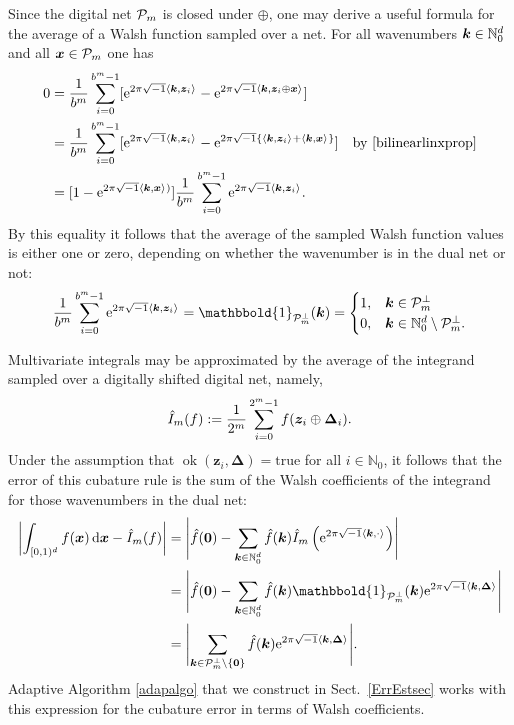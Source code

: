 \documentclass[graybox,footinfo]{svmult}
\newcommand{\N}{\mathbb{N}} %
\newcommand{\bszero}{\boldsymbol{0}} %
\newcommand{\bsx}{\boldsymbol{x}}    %
\newcommand{\bsz}{\boldsymbol{z}}    %
\newcommand{\bsDelta}{\boldsymbol{\Delta}}    %
\newcommand{\ind}{\mathbbold{1}}
\DeclareMathOperator{\ok}{ok}
\begin{document}
Since the digital net $\mathcal{P}_m$ is closed under $\oplus$, one may derive a useful formula for the average of a Walsh function sampled over a net. For all wavenumbers $\bsk \in \N_0^d$ and all $\bsx \in \cp_m$ one has
\begin{align*} 
\nonumber
0 & = \frac{1}{b^m} \sum_{i=0}^{b^m-1} [\E^{2 \pi \sqrt{-1} \ip{\bsk}{\bsz_i}} - \E^{2 \pi \sqrt{-1} \ip{\bsk}{\bsz_i \oplus \bsx}}]\\
\nonumber
& = \frac{1}{b^m} \sum_{i=0}^{b^m-1} [\E^{2 \pi \sqrt{-1} \ip{\bsk}{\bsz_i}} - \E^{2 \pi \sqrt{-1} \{\ip{\bsk}{\bsz_i}+\ip{\bsk}{\bsx}\}}] \quad \text{by } \eqref{bilinearlinxprop}\\
\label{sumeq}
& = [1 - \E^{2 \pi \sqrt{-1} \ip{\bsk}{\bsx})}] \frac{1}{b^m} \sum_{i=0}^{b^m-1}  \E^{2 \pi \sqrt{-1} \ip{\bsk}{\bsz_i}}.
\end{align*}
By this equality it follows that the average of the sampled Walsh function values is either one or zero, depending on whether the wavenumber is in the dual net or not:
\begin{equation}
\frac{1}{b^m} \sum_{i=0}^{b^m-1}  \E^{2 \pi \sqrt{-1} \ip{\bsk}{\bsz_i}} = \ind_{\cp_m^{\perp}}(\bsk) = \begin{cases} 1 , & \bsk \in \cp_m^{\perp}\\
 0,  & \bsk \in \N_0^d \setminus \cp_m^{\perp}.
 \end{cases} \label{Walsherr}
\end{equation}

Multivariate integrals may be approximated by the average  of the integrand sampled over a digitally shifted digital net, namely,
\begin{equation} \label{cubaturedef}
\hI_m(f) := \frac{1}{2^m} \sum_{i=0}^{2^m-1} f(\bsz_i \oplus\bsDelta_i).
\end{equation}
Under the assumption that $\ok(\bsz_i,\bsDelta) = \text{true}$ for all $i \in \N_0$, it follows that the error of this cubature rule is the sum of the Walsh coefficients of the integrand for those wavenumbers in the dual net:
\begin{align}
\nonumber
\biggabs{ \int_{\cube} f(\bsx) \, \D \bsx - \hI_m(f)} 
& = \Biggabs {\hf(\bszero) - \sum_{\bsk \in \N_0^d} \hf(\bsk) \hI_m\left(\E^{2 \pi \sqrt{-1} \ip{\bsk}{\cdot}}\right)} \\
\nonumber
& = \Biggabs {\hf(\bszero) - \sum_{\bsk \in \N_0^d} \hf(\bsk) \ind_{\cp_m^{\perp}}(\bsk) \E^{2 \pi \sqrt{-1} \ip{\bsk}{\bsDelta}}} \\ 
& = \Biggabs {\sum_{\bsk \in \cp_m^{\perp}\setminus \{\bszero\} } \hf(\bsk) \E^{2 \pi \sqrt{-1} \ip{\bsk}{\bsDelta}}}. \label{err1}
\end{align}
Adaptive Algorithm \ref{adapalgo} that we construct in Sect.\ \ref{ErrEstsec} works with this expression for the cubature error in terms of Walsh coefficients.  
\end{document}
